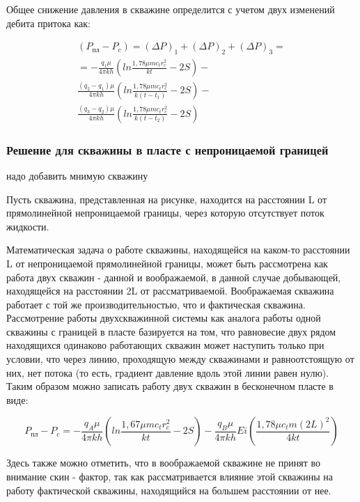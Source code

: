 Общее снижение давления в скважине определится с учетом двух изменений дебита притока как:

\begin{eqnarray}
\left( P_{пл} - P_c\right) = \left( \Delta P\right)_1 + \left( \Delta P\right)_2 +\left( \Delta P\right)_3 = \nonumber  \\ 
= - \frac{q_1 \mu}{4\pi kh} \left( ln \frac{1,78 \mu m c_t r_c^2}{kt}-2S \right) - \nonumber  \\ 
\frac{ \left(q_2 - q_1\right)\mu}{4\pi kh} \left( ln \frac{1,78 \mu m c_t r_c^2}{k\left(t-t_1\right)}-2S \right)- \nonumber  \\ 
\frac{ \left(q_3 - q_2\right)\mu}{4\pi kh} \left( ln \frac{1,78 \mu m c_t r_c^2}{k\left(t-t_2\right)}-2S \right)
\end{eqnarray}



\subsubsection{Решение для скважины в пласте с непроницаемой границей}
надо добавить мнимую скважину

Пусть скважина, представленная на рисунке, находится на расстоянии L от прямолинейной непроницаемой границы, через которую отсутствует поток жидкости.



Математическая задача о работе скважины, находящейся на каком-то расстоянии L от непроницаемой прямолинейной границы, может быть рассмотрена как  работа двух скважин - данной и воображаемой, в данной случае добывающей, находящейся на расстоянии 2L от рассматриваемой. Воображаемая скважина работает с той же производительностью, что и фактическая скважина. Рассмотрение работы двухскважинной системы как аналога работы одной скважины с границей в пласте базируется на том, что равновесие двух рядом находящихся одинаково работающих скважин может наступить только при условии, что через линию, проходящую между скважинами и равноотстоящую от них, нет потока (то есть, градиент давление вдоль этой линии равен нулю). Таким образом можно записать работу двух скважин в бесконечном пласте в виде:

$$ P_{пл} - P_c = - \frac{q_A \mu}{4\pi kh} \left( ln \frac{1,67 \mu m c_t r_c^2}{kt}-2S \right)- \frac{q_B \mu}{4\pi kh} Ei \left( \frac{1,78 \mu c_t m \left(2L\right)^2}{4kt} \right)$$

Здесь также можно отметить, что в воображаемой скважине не принят во внимание скин - фактор, так как рассматривается влияние этой скважины на работу фактической скважины, находящийся на большем расстоянии от нее. 



